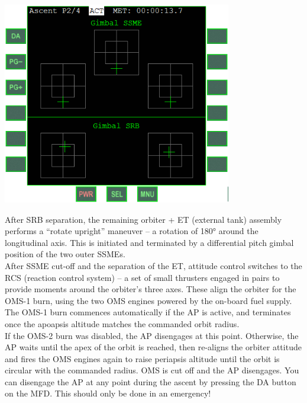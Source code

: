 \begin{center}
\includegraphics[width=0.75\textwidth]{Images//Pic5.png}
\end{center}

After SRB separation, the remaining orbiter + ET (external tank) assembly performs a “rotate upright” maneuver – a rotation of 180° around the longitudinal axis. This is initiated and terminated by a differential pitch gimbal position of the two outer SSMEs.\\

After SSME cut-off and the separation of the ET, attitude control switches to the RCS (reaction control system) – a set of small thrusters engaged in pairs to provide moments around the orbiter’s three axes. These align the orbiter for the OMS-1 burn, using the two OMS engines powered by the on-board fuel supply. The OMS-1 burn commences automatically if the AP is active, and terminates once the apoapsis altitude matches the commanded orbit radius.\\

If the OMS-2 burn was disabled, the AP disengages at this point. Otherwise, the AP waits until the apex of the orbit is reached, then re-aligns the orbiter attitude and fires the OMS engines again to raise periapsis altitude until the orbit is circular with the commanded radius. OMS is cut off and the AP disengages.
You can disengage the AP at any point during the ascent by pressing the DA button on the MFD. This should only be done in an emergency!

